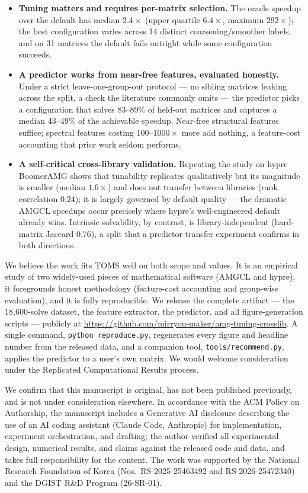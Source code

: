 \documentclass[11pt]{article}
\begin{document}
\begin{itemize}
\item \textbf{Tuning matters and requires per-matrix selection.} The oracle
speedup over the default has median $2.4\times$ (upper quartile $6.4\times$,
maximum $292\times$); the best configuration varies across 14 distinct
coarsening/smoother labels, and on 31 matrices the default fails outright while
some configuration succeeds.
\item \textbf{A predictor works from near-free features, evaluated honestly.}
Under a strict leave-one-group-out protocol --- no sibling matrices leaking
across the split, a check the literature commonly omits --- the predictor picks
a configuration that solves 83--89\% of held-out matrices and captures a median
43--49\% of the achievable speedup. Near-free structural features suffice;
spectral features costing $100$--$1000\times$ more add nothing, a feature-cost
accounting that prior work seldom performs.
\item \textbf{A self-critical cross-library validation.} Repeating the study on
hypre BoomerAMG shows that tunability replicates qualitatively but its magnitude
is smaller (median $1.6\times$) and does not transfer between libraries (rank
correlation $0.24$); it is largely governed by default quality --- the dramatic
AMGCL speedups occur precisely where hypre's well-engineered default already
wins. Intrinsic solvability, by contrast, is library-independent (hard-matrix
Jaccard $0.76$), a split that a predictor-transfer experiment confirms in both
directions.
\end{itemize}

We believe the work fits TOMS well on both scope and values. It is an empirical
study of two widely-used pieces of mathematical software (AMGCL and hypre), it
foregrounds honest methodology (feature-cost accounting and group-wise
evaluation), and it is fully reproducible. We release the complete artifact ---
the 18{,}600-solve dataset, the feature extractor, the predictor, and all
figure-generation scripts --- publicly at
\url{https://github.com/mirryou-maker/amg-tuning-crosslib}. A single command,
\texttt{python reproduce.py}, regenerates every figure and headline number from
the released data, and a companion tool, \texttt{tools/recommend.py}, applies
the predictor to a user's own matrix. We would welcome consideration under the
Replicated Computational Results process.

We confirm that this manuscript is original, has not been published previously,
and is not under consideration elsewhere. In accordance with the ACM Policy on
Authorship, the manuscript includes a Generative AI disclosure describing the
use of an AI coding assistant (Claude Code, Anthropic) for implementation,
experiment orchestration, and drafting; the author verified all experimental
design, numerical results, and claims against the released code and data, and
takes full responsibility for the content. The work was supported by the
National Research Foundation of Korea (Nos.\ RS-2025-25463492 and
RS-2026-25472340) and the DGIST R\&D Program (26-SR-01).
\end{document}
